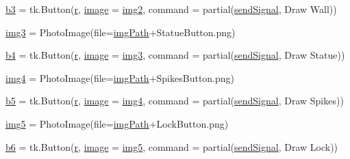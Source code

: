 \begin{DoxyCompactItemize}
\item 
\mbox{\hyperlink{namespace_g_u_i_ae03019b48b46235fcf9eb1ae963fd68e}{b3}} = tk.\+Button(\mbox{\hyperlink{_s_d_l__opengl_8h_a42ce7cdc612e53abee15043f80220d97}{r}}, \mbox{\hyperlink{_s_d_l__opengl_8h_a0a221b005894579fea3b9eb7bfc2ee71}{image}} = \mbox{\hyperlink{namespace_g_u_i_a49cad6894844031f41a996947032a4a4}{img2}}, command = partial(\mbox{\hyperlink{namespace_g_u_i_ae82f740e6453cdd542b52ede1560c2c3}{send\+Signal}}, \textquotesingle{}Draw Wall\textquotesingle{}))
\item 
\mbox{\hyperlink{namespace_g_u_i_a06adcfe75921645a1ef64cf7a4cdb3fd}{img3}} = Photo\+Image(file=\mbox{\hyperlink{namespace_g_u_i_a293e22c0a27a45862ad50fcb8ed12f15}{img\+Path}}+\textquotesingle{}Statue\+Button.\+png\textquotesingle{})
\item 
\mbox{\hyperlink{namespace_g_u_i_a4e69ff82719fbda902c3b2126e79d692}{b4}} = tk.\+Button(\mbox{\hyperlink{_s_d_l__opengl_8h_a42ce7cdc612e53abee15043f80220d97}{r}}, \mbox{\hyperlink{_s_d_l__opengl_8h_a0a221b005894579fea3b9eb7bfc2ee71}{image}} = \mbox{\hyperlink{namespace_g_u_i_a06adcfe75921645a1ef64cf7a4cdb3fd}{img3}}, command = partial(\mbox{\hyperlink{namespace_g_u_i_ae82f740e6453cdd542b52ede1560c2c3}{send\+Signal}}, \textquotesingle{}Draw Statue\textquotesingle{}))
\item 
\mbox{\hyperlink{namespace_g_u_i_a63bec101ed0dcb5864839c78fcb02572}{img4}} = Photo\+Image(file=\mbox{\hyperlink{namespace_g_u_i_a293e22c0a27a45862ad50fcb8ed12f15}{img\+Path}}+\textquotesingle{}Spikes\+Button.\+png\textquotesingle{})
\item 
\mbox{\hyperlink{namespace_g_u_i_ab78877371456f13f3765198ec7ee8d91}{b5}} = tk.\+Button(\mbox{\hyperlink{_s_d_l__opengl_8h_a42ce7cdc612e53abee15043f80220d97}{r}}, \mbox{\hyperlink{_s_d_l__opengl_8h_a0a221b005894579fea3b9eb7bfc2ee71}{image}} = \mbox{\hyperlink{namespace_g_u_i_a63bec101ed0dcb5864839c78fcb02572}{img4}}, command = partial(\mbox{\hyperlink{namespace_g_u_i_ae82f740e6453cdd542b52ede1560c2c3}{send\+Signal}}, \textquotesingle{}Draw Spikes\textquotesingle{}))
\item 
\mbox{\hyperlink{namespace_g_u_i_a3e9631bef05195054e18899712ee62e7}{img5}} = Photo\+Image(file=\mbox{\hyperlink{namespace_g_u_i_a293e22c0a27a45862ad50fcb8ed12f15}{img\+Path}}+\textquotesingle{}Lock\+Button.\+png\textquotesingle{})
\item 
\mbox{\hyperlink{namespace_g_u_i_a8b3fe1a314a7f97eb58e91a936f16d24}{b6}} = tk.\+Button(\mbox{\hyperlink{_s_d_l__opengl_8h_a42ce7cdc612e53abee15043f80220d97}{r}}, \mbox{\hyperlink{_s_d_l__opengl_8h_a0a221b005894579fea3b9eb7bfc2ee71}{image}} = \mbox{\hyperlink{namespace_g_u_i_a3e9631bef05195054e18899712ee62e7}{img5}}, command = partial(\mbox{\hyperlink{namespace_g_u_i_ae82f740e6453cdd542b52ede1560c2c3}{send\+Signal}}, \textquotesingle{}Draw Lock\textquotesingle{}))

\end{DoxyCompactItemize}
